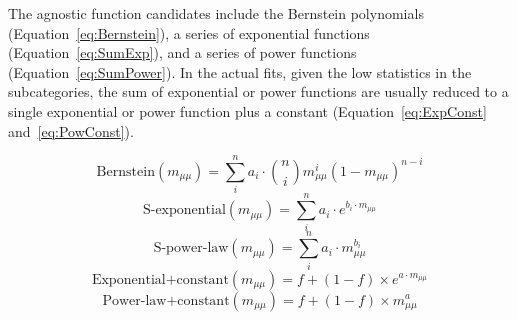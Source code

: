 The agnostic function candidates include the Bernstein polynomials (Equation~\ref{eq:Bernstein}), 
a series of exponential functions (Equation~\ref{eq:SumExp}), and a series of power functions (Equation~\ref{eq:SumPower}).
In the actual fits, given the low statistics in the \VH subcategories, the sum of exponential or power functions are usually reduced to 
a single exponential or power function plus a constant (Equation~\ref{eq:ExpConst} and~\ref{eq:PowConst}).

\begin{equation}\label{eq:Bernstein}
  \mathrm{Bernstein}(m_{\mu\mu}) = \sum_{i}^{n} a_{i} \cdot \binom{n}{i} m_{\mu\mu}^{i}(1-m_{\mu\mu})^{n-i}
\end{equation}
\begin{equation}\label{eq:SumExp}
  \mathrm{S\textrm{-}exponential}(m_{\mu\mu}) = \sum_{i}^{n} a_{i} \cdot e^{b_{i} \cdot m_{\mu\mu}}
\end{equation}
\begin{equation}\label{eq:SumPower}
  \mathrm{S\textrm{-}power\textrm{-}law}(m_{\mu\mu}) = \sum_{i}^{n} a_{i} \cdot m_{\mu\mu}^{b_{i}}
\end{equation}
\begin{equation}\label{eq:ExpConst}
  \mathrm{Exponential\textrm{+}constant}(m_{\mu\mu}) = f+(1-f)\times e^{a\cdot m_{\mu\mu}}
\end{equation}
\begin{equation}\label{eq:PowConst}
  \mathrm{Power\textrm{-}law\textrm{+}constant}(m_{\mu\mu}) = f+(1-f)\times m_{\mu\mu}^{a}
\end{equation}

